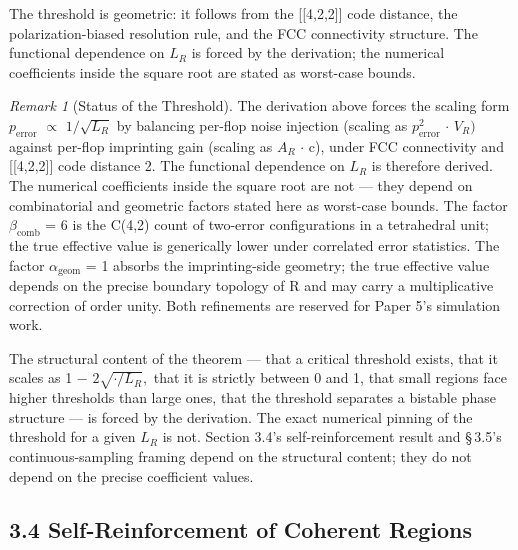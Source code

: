 \documentclass[11pt,oneside]{report}
\theoremstyle{definition}
\theoremstyle{remark}
\newtheorem{remark}[theorem]{Remark}
\begin{document}
The threshold is geometric: it follows from the [[4,2,2]] code
distance, the polarization-biased resolution rule, and the FCC
connectivity structure. The functional dependence on \ensuremath{L_{R}} is forced by
the derivation; the numerical coefficients inside the square root are
stated as worst-case bounds.

\begin{remark}[Status of the Threshold]
The derivation above forces
the scaling form \ensuremath{p_{\mathrm{error}}} \ensuremath{\propto} \ensuremath{1/\sqrt{L_{R}}} by balancing per-flop noise
injection (scaling as \ensuremath{p^{2}_{\mathrm{error}}} \ensuremath{\cdot} \ensuremath{V_{R})} against per-flop imprinting gain
(scaling as \ensuremath{A_{R}} \ensuremath{\cdot} c), under FCC connectivity and [[4,2,2]] code
distance 2. The functional dependence on \ensuremath{L_{R}} is therefore derived. The
numerical coefficients inside the square root are not --- they depend on
combinatorial and geometric factors stated here as worst-case bounds.
The factor \ensuremath{\beta_{\mathrm{comb}}} = 6 is the C(4,2) count of two-error configurations
in a tetrahedral unit; the true effective value is generically lower
under correlated error statistics. The factor \ensuremath{\alpha_{\mathrm{geom}}} = 1 absorbs the
imprinting-side geometry; the true effective value depends on the
precise boundary topology of R and may carry a multiplicative correction
of order unity. Both refinements are reserved for Paper 5's simulation
work.
\end{remark}

The structural content of the theorem --- that a critical threshold
exists, that it scales as 1 \ensuremath{-} \ensuremath{2\sqrt{\cdot /L_{R}},} that it is strictly between 0
and 1, that small regions face higher thresholds than large ones, that
the threshold separates a bistable phase structure --- is forced by the
derivation. The exact numerical pinning of the threshold for a given
\ensuremath{L_{R}} is not. Section 3.4's self-reinforcement result and \S\,3.5's
continuous-sampling framing depend on the structural content; they do
not depend on the precise coefficient values.

\subsection*{3.4 Self-Reinforcement of Coherent Regions}
\end{document}
